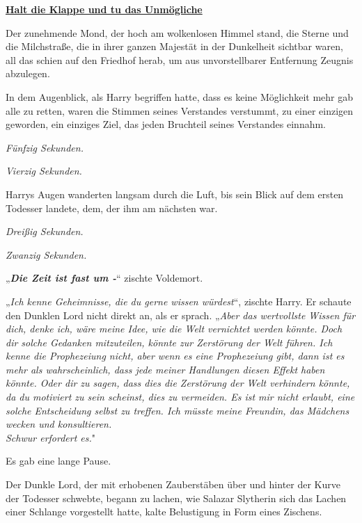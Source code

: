 

\hypertarget{halt-die-klappe-und-tu-das-unmuxf6gliche}{%

\textbf{\uline{Halt die Klappe und tu das Unmögliche}}

Der zunehmende Mond, der hoch am wolkenlosen Himmel stand, die Sterne und die Milchstraße, die in ihrer ganzen Majestät in der Dunkelheit sichtbar waren, all das schien auf den Friedhof herab, um aus unvorstellbarer Entfernung Zeugnis abzulegen.

In dem Augenblick, als Harry begriffen hatte, dass es keine Möglichkeit mehr gab alle zu retten, waren die Stimmen seines Verstandes verstummt, zu einer einzigen geworden, ein einziges Ziel, das jeden Bruchteil seines Verstandes einnahm.

\emph{Fünfzig Sekunden.}

\emph{Vierzig Sekunden.}

Harrys Augen wanderten langsam durch die Luft, bis sein Blick auf dem ersten Todesser landete, dem, der ihm am nächsten war.

\emph{Dreißig Sekunden.}

\emph{Zwanzig Sekunden.}

„\textbf{\emph{Die Zeit ist fast um -}}“ zischte Voldemort.

„\emph{Ich kenne Geheimnisse, die du gerne wissen würdest}“, zischte Harry. Er schaute den Dunklen Lord nicht direkt an, als er sprach. „\emph{Aber das wertvollste Wissen für dich, denke ich, wäre meine Idee, wie die Welt vernichtet werden könnte. Doch dir solche Gedanken mitzuteilen, könnte zur Zerstörung der Welt führen. Ich kenne die Prophezeiung nicht, aber wenn es eine Prophezeiung gibt, dann ist es mehr als wahrscheinlich, dass jede meiner Handlungen diesen Effekt haben könnte. Oder dir zu sagen, dass dies die Zerstörung der Welt verhindern könnte, da du motiviert zu sein scheinst, dies zu vermeiden. Es ist mir nicht erlaubt, eine solche Entscheidung selbst zu treffen. Ich müsste meine Freundin, das Mädchens wecken und konsultieren.\\ Schwur erfordert es.}"

Es gab eine lange Pause.

Der Dunkle Lord, der mit erhobenen Zauberstäben über und hinter der Kurve der Todesser schwebte, begann zu lachen, wie Salazar Slytherin sich das Lachen einer Schlange vorgestellt hatte, kalte Belustigung in Form eines Zischens.

}
